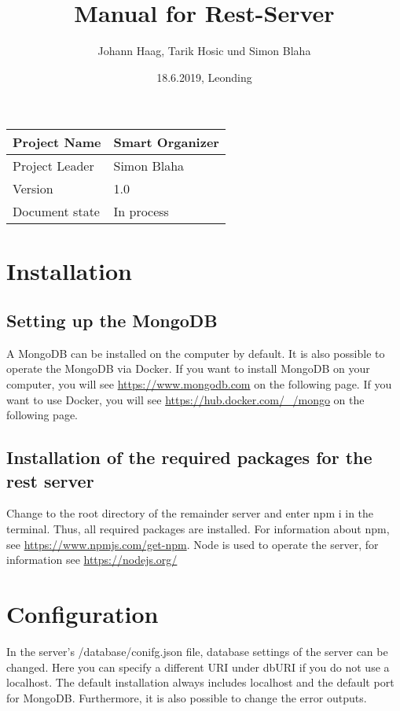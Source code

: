 \documentclass[12pt]{scrartcl}
\title{Manual for Rest-Server}
\author{Johann Haag, Tarik Hosic und Simon Blaha}
\date{18.6.2019, Leonding}
\begin{document}
    \maketitle
    \begin{flushleft}
    \begin{tabular}{|l|l|}
    \hline
    Project Name & Smart Organizer \\ \hline
    Project Leader & Simon Blaha \\ \hline
    Version & 1.0\\ \hline
    Document state & In process \\ \hline
    \end{tabular}
    \end{flushleft}

    \pagebreak
    \tableofcontents
    \pagebreak

    \section{Installation}
    \subsection{Setting up the MongoDB}
        A MongoDB can be installed on the computer by default. It is also possible to operate the MongoDB via Docker.
        If you want to install MongoDB on your computer, you will see \url{https://www.mongodb.com} on the following page.
        If you want to use Docker, you will see \url{https://hub.docker.com/_/mongo} on the following page.
    \subsection{Installation of the required packages for the rest server}
        Change to the root directory of the remainder server and enter npm i in the terminal.
        Thus, all required packages are installed.
        For information about npm, see \url{https://www.npmjs.com/get-npm}.
        Node is used to operate the server, for information see \url{https://nodejs.org/}

    \section{Configuration}      
        In the server's /database/conifg.json file, database settings of the server can be changed.
        Here you can specify a different URI under dbURI if you do not use a localhost.
        The default installation always includes localhost and the default port for MongoDB.
        Furthermore, it is also possible to change the error outputs.
\end{document}
